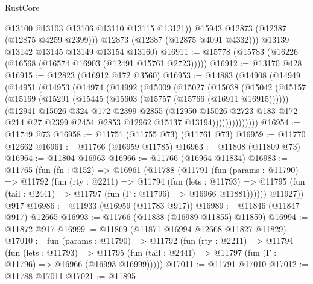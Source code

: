 \begin{lexlean}{RustCore}
\begin{coremodule}
              @13100
              @13103
              @13106
              @13110
              @13115
              @13121))
          @15943
          @12873
          (@12387 (@12875 @4259 @2399)))
        @12873
        (@12387 (@12875 @4091 @4332)))
      @13139
      @13142
      @13145
      @13149
      @13154
      @13160)
@16911 := @15778 (@15783 (@16226 (@16568 (@16574 @16903 (@12491 @15761 @2723)))))
@16912 := @13170 @428
@16915 := @12823 (@16912 @172 @3560)
@16953 := @14883
    (@14908
      (@14949
        (@14951
          (@14953
            (@14974
              (@14992
                (@15009
                  (@15027
                    (@15038
                      (@15042
                        (@15157
                          (@15169
                            (@15291 (@15445 (@15603 (@15757 (@15766 (@16911 @16915))))))
                            (@12941
                              @15026
                              @324
                              @172
                              @2399
                              @2855
                              (@12950
                                @15026
                                @2723
                                @183
                                @172
                                @214
                                @27
                                @2399
                                @2454
                                @2853
                                @12962
                                @15137
                                @13194))))))))))))))
@16954 := @11749 @73
@16958 := @11751 (@11755 @73) (@11761 @73)
@16959 := @11770 @12662
@16961 := @11766 (@16959 @11785)
@16963 := @11808 (@11809 @73)
@16964 := @11804 @16963
@16966 := @11766 (@16964 @11834)
@16983 := @11765
    (fun (fn : @152) =>
    @16961
      (@11788
        (@11791
          (fun (params : @11790) =>
          @11792
            (fun (rty : @2211) =>
            @11794
              (fun (lets : @11793) =>
              @11795 (fun (tail : @2441) => @11797 (fun (Γ : @11796) => @16966 @11881))))))
        @11927))
    @917
@16986 := @11933 (@16959 (@11783 @917))
@16989 := @11846 (@11847 @917) @12665
@16993 := @11766 (@11838 (@16989 @11855) @11859)
@16994 := @11872 @917
@16999 := @11869 (@11871 @16994 @12668 @11827 @11829)
@17010 := fun (params : @11790) =>
  @11792
    (fun (rty : @2211) =>
    @11794
      (fun (lets : @11793) =>
      @11795 (fun (tail : @2441) => @11797 (fun (Γ : @11796) => @16966 (@16993 @16999)))))
@17011 := @11791 @17010
@17012 := @11788 @17011
@17021 := @11895

\end{coremodule}
\end{lexlean}
